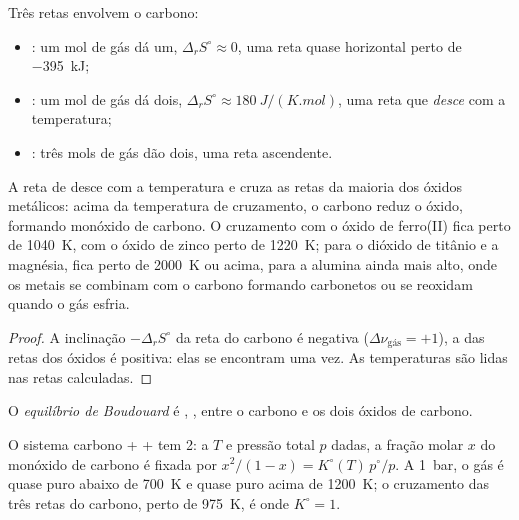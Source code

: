 Três retas envolvem o carbono:
\begin{itemize}
  \item {}: um mol de gás dá um, $\Delta_r S^\circ
        \approx 0$, uma reta quase horizontal perto de \qty{-395}{kJ};
  \item {}: um mol de gás dá dois, $\Delta_r S^\circ
        \approx \qty{+180}{J/(K.mol)}$, uma reta que \emph{desce} com a temperatura;
  \item {}: três mols de gás dão dois, uma reta ascendente.
\end{itemize}

\begin{proposition}\label{prop:b2:ellingham:carbon}
A reta de  desce com a temperatura e cruza as retas da
maioria dos óxidos metálicos: acima da temperatura de cruzamento, o carbono
reduz o óxido, formando monóxido de carbono. O cruzamento com o óxido de
ferro(II) fica perto de \qty{1040}{K}, com o óxido de zinco perto de
\qty{1220}{K}; para o dióxido de titânio e a magnésia, fica perto de
\qty{2000}{K} ou acima, para a alumina ainda mais alto, onde os metais se
combinam com o carbono formando carbonetos ou se reoxidam quando o gás esfria.
\end{proposition}

\begin{proof}
A inclinação $-\Delta_r S^\circ$ da reta do carbono é negativa ($\Delta\nu_{\text{gás}}
= +1$), a das retas dos óxidos é positiva: elas se encontram uma vez. As
temperaturas são lidas nas retas calculadas.
\end{proof}

\begin{definition}\label{def:b2:ellingham:boudouard}
O \emph{equilíbrio de Boudouard} é ,
, entre o carbono e os dois óxidos de carbono.
\end{definition}

\begin{proposition}\label{prop:b2:ellingham:boudouard}
O sistema carbono +  +  tem  2: a $T$ e pressão total
$p$ dadas, a fração molar $x$ do monóxido de carbono é fixada por $x^2/(1 - x)
= K^\circ(T)\,p^\circ/p$. A \qty{1}{bar}, o gás é quase  puro
abaixo de \qty{700}{K} e quase  puro acima de \qty{1200}{K}; o
cruzamento das três retas do carbono, perto de \qty{975}{K}, é onde $K^\circ = 1$.
\end{proposition}

